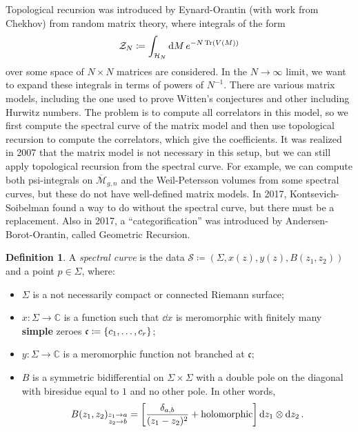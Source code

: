\documentclass[leqno, openany]{memoir}
\theoremstyle{definition}
\newtheorem{defn}[thm]{Definition}
\theoremstyle{remark}
\theoremstyle{plain}
\theoremstyle{definition}
\theoremstyle{remark}
\newcommand{\C}{\mathbb{C}}
\newcommand{\mc}[1]{\mathcal{#1}}
\newcommand{\mf}[1]{\mathfrak{#1}}
\newcommand{\ol}[1]{\overline{#1}}
\begin{document}
Topological recursion was introduced by Eynard-Orantin (with work from Chekhov) from random matrix theory, where integrals of the form
\[ \mc{Z}_N \coloneqq \int_{\mc{H}_N} \dd{M} e^{-N \Tr(V(M))} \]
over some space of $N \times N$ matrices are considered. In the $N \to \infty$ limit, we want to expand these integrals in terms of powers of $N^{-1}$. There are various matrix models, including the one used to prove Witten's conjectures and other including Hurwitz numbers. The problem is to compute all correlators in this model, so we first compute the spectral curve of the matrix model and then use topological recursion to compute the correlators, which give the coefficients. It was realized in 2007 that the matrix model is not necessary in this setup, but we can still apply topological recursion from the spectral curve. For example, we can compute both psi-integrals on $\ol{\mc{M}}_{g,n}$ and the Weil-Petersson volumes from some spectral curves, but these do not have well-defined matrix models. In 2017, Kontsevich-Soibelman found a way to do without the spectral curve, but there must be a replacement. Also in 2017, a ``categorification'' was introduced by Andersen-Borot-Orantin, called Geometric Recursion.

\begin{defn}
  A \textit{spectral curve} is the data $\mc{S} \coloneqq (\Sigma, x(z), y(z), B(z_1, z_2))$ and a point $p \in \Sigma$, where:
  \begin{itemize}
  \item $\Sigma$ is a not necessarily compact or connected Riemann surface;
  \item $x \colon \Sigma \to \C$ is a function such that $\dd{x}$ is meromorphic with finitely many \textbf{simple} zeroes $\mf{c} \coloneqq \qty{ c_1, \ldots, c_r }$;
  \item $y \colon \Sigma \to \C$ is a meromorphic function not branched at $\mf{c}$;
  \item $B$ is a symmetric bidifferential on $\Sigma \times \Sigma$ with a double pole on the diagonal with biresidue equal to $1$ and no other pole. In other words,
    \[B(z_1, z_2)_{\substack{z_1 \to a \\ z_2 \to b}} = \qty[\frac{\delta_{a,b}}{(z_1-z_2)^2} + \text{holomorphic}] \dd{z_1} \otimes \dd{z_2}. \]
  \end{itemize}
\end{defn}
\end{document}
